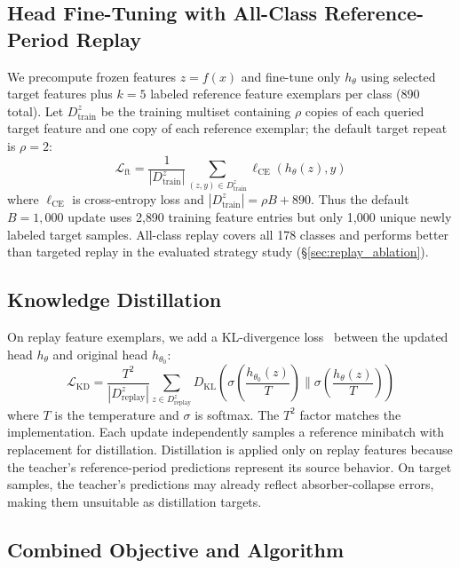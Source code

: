 \documentclass[preprint,12pt,authoryear]{elsarticle}
\let\cite\citep
\begin{document}
\subsection{Head Fine-Tuning with All-Class Reference-Period Replay}
\label{sec:ft_replay}

We precompute frozen features $z=f(x)$ and fine-tune only $h_\theta$ using selected target features plus $k{=}5$ labeled reference feature exemplars per class (890 total). Let $D_{\text{train}}^z$ be the training multiset containing $\rho$ copies of each queried target feature and one copy of each reference exemplar; the default target repeat is $\rho{=}2$:
\begin{equation}
  \mathcal{L}_{\text{ft}} = \frac{1}{|D_{\text{train}}^z|} \sum_{(z,y)\in D_{\text{train}}^z} \ell_{\text{CE}}(h_\theta(z), y)
\end{equation}
where $\ell_{\text{CE}}$ is cross-entropy loss and $|D_{\text{train}}^z|=\rho B+890$. Thus the default $B{=}1{,}000$ update uses 2{,}890 training feature entries but only 1{,}000 unique newly labeled target samples.
All-class replay covers all 178 classes and performs better than targeted replay in the evaluated strategy study (\S\ref{sec:replay_ablation}).

\subsection{Knowledge Distillation}
\label{sec:distill}

On replay feature exemplars, we add a KL-divergence loss~\cite{hinton2015distilling} between the updated head $h_\theta$ and original head $h_{\theta_0}$:
\begin{equation}
  \mathcal{L}_{\text{KD}} = \frac{T^2}{|D_{\text{replay}}^z|} \!\sum_{z \in D_{\text{replay}}^z} D_{\text{KL}}\!\!\left(\sigma\!\!\left(\frac{h_{\theta_0}(z)}{T}\right) \!\Big\|\! \sigma\!\!\left(\frac{h_\theta(z)}{T}\right)\!\right)
\end{equation}
where $T$ is the temperature and $\sigma$ is softmax. The $T^2$ factor matches the implementation. Each update independently samples a reference minibatch with replacement for distillation.
Distillation is applied only on replay features because the teacher's reference-period predictions represent its source behavior.
On target samples, the teacher's predictions may already reflect absorber-collapse errors, making them unsuitable as distillation targets.

\subsection{Combined Objective and Algorithm}
\end{document}

